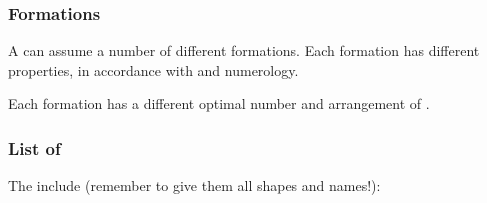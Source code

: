 \subsubsection{Formations}
A \matrix can assume a number of different formations. 
Each formation has different properties, in accordance with  and numerology. 

Each formation has a different optimal number and arrangement of . 





\subsubsection{List of \matrices}
The \matrices{} include (remember to give them all shapes and names!):

